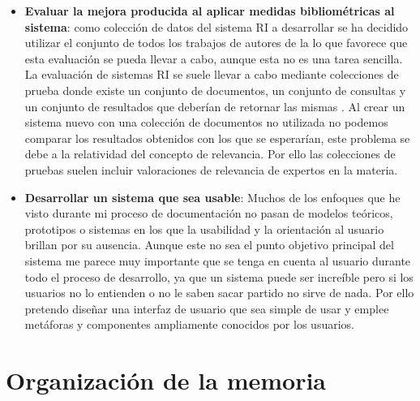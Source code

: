 \begin{itemize}
	\item \textbf{Evaluar la mejora producida al aplicar medidas bibliométricas al sistema}: como colección de datos del sistema \acrshort{RI} a desarrollar se ha decidido utilizar el conjunto de todos los trabajos de autores de la \myFaculty lo que favorece que esta evaluación se pueda llevar a cabo, aunque esta no es una tarea sencilla. La evaluación de sistemas \acrshort{RI} se suele llevar a cabo mediante colecciones de prueba donde existe un conjunto de documentos, un conjunto de consultas y un conjunto de resultados que deberían de retornar las mismas  \cite{RI_Evaluation}. Al crear un sistema nuevo con una colección de documentos no utilizada no podemos comparar los resultados obtenidos con los que se esperarían, este problema se debe a la relatividad del concepto de relevancia. Por ello las colecciones de pruebas suelen incluir valoraciones de relevancia de expertos en la materia.
	\item \textbf{Desarrollar un sistema que sea usable}: Muchos de los enfoques que he visto durante mi proceso de documentación no pasan de modelos teóricos, prototipos o sistemas en los que la usabilidad y la orientación al usuario brillan por su ausencia. Aunque este no sea el punto objetivo principal del sistema me parece muy importante que se tenga en cuenta al usuario durante todo el proceso de desarrollo, ya que un sistema puede ser increíble pero si los usuarios no lo entienden o no le saben sacar partido no sirve de nada. Por ello pretendo diseñar una interfaz de usuario que sea simple de usar y emplee metáforas y componentes ampliamente conocidos por los usuarios.

\end{itemize}


\section{Organización de la memoria}



